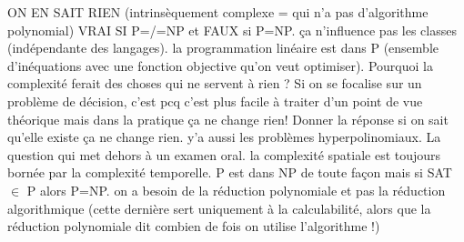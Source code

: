 \begin{mcqs}
  {ON EN SAIT RIEN (intrinsèquement complexe = qui n'a pas d'algorithme polynomial) VRAI SI P=/=NP et FAUX si P=NP.}
  {ça n'influence pas les classes (indépendante des langages).}
  {la programmation linéaire est dans P (ensemble d'inéquations avec une fonction objective qu'on veut optimiser).}
  {Pourquoi la complexité ferait des choses qui ne servent à rien ? Si on se focalise sur un problème de décision, c'est pcq c'est plus facile à traiter d'un point de vue théorique mais dans la pratique ça ne change rien! Donner la réponse si on sait qu'elle existe ça ne change rien.}
  {y'a aussi les problèmes hyperpolinomiaux.}
  {La question qui met dehors à un examen oral.}
  {la complexité spatiale est toujours bornée par la complexité temporelle.}
  {P est dans NP de toute façon mais si SAT $\in$ P alors P=NP.}
  {}
  {on a besoin de la réduction polynomiale et pas la réduction algorithmique (cette dernière sert uniquement à la calculabilité, alors que la réduction polynomiale dit combien de fois on utilise l'algorithme !)}
\end{mcqs}
